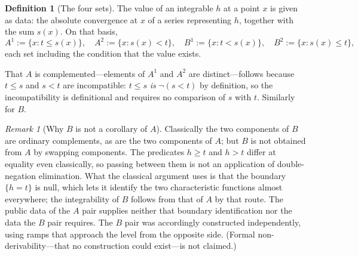 \documentclass[11pt]{article}
\theoremstyle{definition}
\newtheorem{definition}[theorem]{Definition}
\theoremstyle{remark}
\newtheorem{remark}[theorem]{Remark}
\begin{document}
\begin{definition}[The four sets]
\label{def:b-foursets}
The value of an integrable $h$ at a point $x$ is given as data: the absolute convergence at $x$ of a series representing $h$, together with the sum $s(x)$.  On that basis,
\[
A^1:=\{x: t\le s(x)\},\quad A^2:=\{x: s(x)<t\},\quad B^1:=\{x: t<s(x)\},\quad B^2:=\{x: s(x)\le t\},
\]
each set including the condition that the value exists.
\end{definition}

That $A$ is complemented---elements of $A^1$ and $A^2$ are distinct---follows because $t\le s$ and $s<t$ are incompatible: $t\le s$ \emph{is} $\neg(s<t)$ by definition, so the incompatibility is definitional and requires no comparison of $s$ with $t$.  Similarly for $B$.

\begin{remark}[Why $B$ is not a corollary of $A$]
\label{rem:b-nocorollary}
Classically the two components of $B$ are ordinary complements, as are the two components
of $A$; but $B$ is not obtained from $A$ by swapping components.  The predicates
$h\ge t$ and $h>t$ differ at equality even classically, so passing between them is not an
application of double-negation elimination.  What the classical argument uses is that the
boundary $\{h=t\}$ is null, which lets it identify the two characteristic functions almost
everywhere; the integrability of $B$ follows from that of $A$ by that route.  The public
data of the $A$ pair supplies neither that boundary identification nor the data the $B$ pair
requires.  The $B$ pair was accordingly constructed independently, using ramps that approach
the level from the opposite side.  (Formal non-derivability---that no construction could
exist---is not claimed.)
\end{remark}
\end{document}
